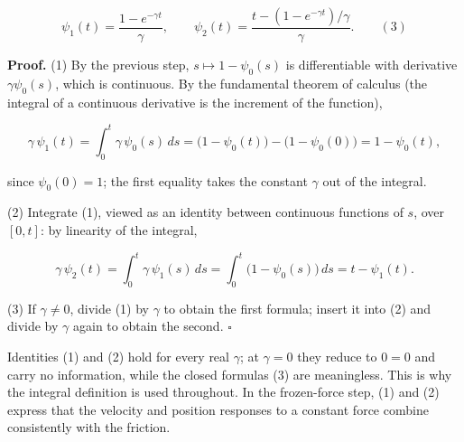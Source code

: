\documentclass[11pt,a4paper]{article}
\begin{document}
\[\psi_1(t)=\frac{1-e^{-\gamma t}}{\gamma},\qquad\psi_2(t)=\frac{t-(1-e^{-\gamma t})/\gamma}{\gamma}.\qquad(3)\]


\textbf{Proof.} (1) By the previous step, \(s\mapsto1-\psi_0(s)\) is differentiable with derivative \(\gamma\psi_0(s)\), which is continuous. By the fundamental theorem of calculus (the integral of a continuous derivative is the increment of the function),


\[\gamma\,\psi_1(t)=\int_0^t\gamma\,\psi_0(s)\,ds=\bigl(1-\psi_0(t)\bigr)-\bigl(1-\psi_0(0)\bigr)=1-\psi_0(t),\]


since \(\psi_0(0)=1\); the first equality takes the constant \(\gamma\) out of the integral.




(2) Integrate (1), viewed as an identity between continuous functions of \(s\), over \([0,t]\): by linearity of the integral,


\[\gamma\,\psi_2(t)=\int_0^t\gamma\,\psi_1(s)\,ds=\int_0^t\bigl(1-\psi_0(s)\bigr)\,ds=t-\psi_1(t).\]


(3) If \(\gamma\neq0\), divide (1) by \(\gamma\) to obtain the first formula; insert it into (2) and divide by \(\gamma\) again to obtain the second. \(\square\)




Identities (1) and (2) hold for every real \(\gamma\); at \(\gamma=0\) they reduce to \(0=0\) and carry no information, while the closed formulas (3) are meaningless. This is why the integral definition is used throughout. In the frozen-force step, (1) and (2) express that the velocity and position responses to a constant force combine consistently with the friction.
\end{document}

